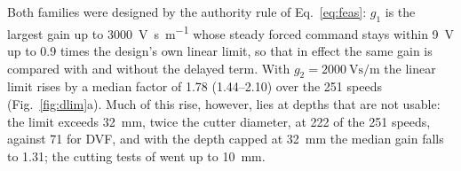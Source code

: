 Both families were designed by the authority rule of Eq.~\eqref{eq:feas}: $g_1$ is the largest gain up to \SI{3000}{\volt\second\per\metre} whose steady forced command stays within \SI{9}{\volt} up to 0.9 times the design's own linear limit, so that in effect the same gain is compared with and without the delayed term. With $g_2=\SI{2000}{\volt\second\per\metre}$ the linear limit rises by a median factor of 1.78 (1.44--2.10) over the 251 speeds (Fig.~\ref{fig:dlim}a). Much of this rise, however, lies at depths that are not usable: the limit exceeds \SI{32}{\milli\metre}, twice the cutter diameter, at 222 of the 251 speeds, against 71 for DVF, and with the depth capped at \SI{32}{\milli\metre} the median gain falls to 1.31; the cutting tests of \citet{ozsoy2026robust} went up to \SI{10}{\milli\metre}.

